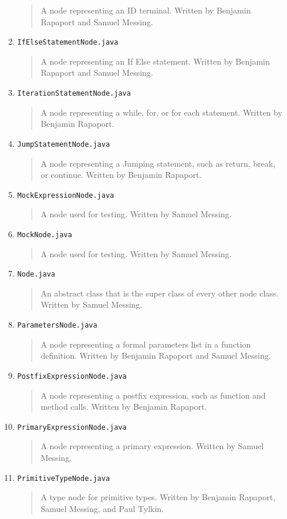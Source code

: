 \documentclass{report}
\begin{document}
\begin{itemize}
\begin{enumerate}
\begin{quotation}
\noindent A node representing an ID terminal. Written by Benjamin Rapaport and Samuel Messing.
\end{quotation}
\item \texttt{IfElseStatementNode.java}
\begin{quotation}
\noindent A node representing an If Else statement. Written by Benjamin Rapaport and Samuel Messing.
\end{quotation}
\item \texttt{IterationStatementNode.java}
\begin{quotation}
\noindent A node representing a while, for, or for each statement. Written by Benjamin Rapaport.
\end{quotation}
\item \texttt{JumpStatementNode.java}
\begin{quotation}
\noindent A node representing a Jumping statement, such as return, break, or continue. Written by Benjamin Rapaport.
\end{quotation}
\item \texttt{MockExpressionNode.java}
\begin{quotation}
\noindent A node used for testing. Written by Samuel Messing.
\end{quotation}
\item \texttt{MockNode.java}
\begin{quotation}
\noindent  A node used for testing. Written by Samuel Messing.
\end{quotation}
\item \texttt{Node.java}
\begin{quotation}
\noindent An abstract class that is the super class of every other node class. Written by Samuel Messing.
\end{quotation}
\item \texttt{ParametersNode.java}
\begin{quotation}
\noindent A node representing a formal parameters list in a function definition. Written by Benjamin Rapaport and Samuel Messing.
\end{quotation}
\item \texttt{PostfixExpressionNode.java}
\begin{quotation}
\noindent A node representing a postfix expression, such as function and method calls. Written by Benjamin Rapaport.
\end{quotation}
\item \texttt{PrimaryExpressionNode.java}
\begin{quotation}
\noindent A node representing a primary expression. Written by Samuel Messing.
\end{quotation}
\item \texttt{PrimitiveTypeNode.java}
\begin{quotation}
\noindent A type node for primitive types. Written by Benjamin Rapaport, Samuel Messing, and Paul Tylkin.
\end{quotation}


\end{enumerate}
\end{itemize}
\end{document}
